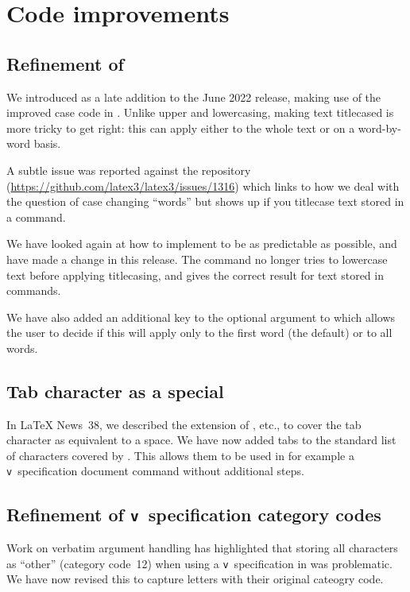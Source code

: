 \documentclass{ltnews}
\begin{document}
\section{Code improvements}

\subsection{Refinement of }

We introduced  as a late addition to the June
2022 release, making use of the improved case code in
. Unlike upper and lowercasing, making text
titlecased is more tricky to get right: this can apply either to
the whole text or on a word-by-word basis.

A subtle issue was reported against the  repository
(\url{https://github.com/latex3/latex3/issues/1316}) which links
to how we deal with the question of case changing
\enquote{words} but shows up if you titlecase text stored in a
command.

We have looked again at how to implement  to
be as predictable as possible, and have made a change in this
release. The command no longer tries to lowercase text before
applying titlecasing, and gives the correct result for text
stored in commands.

We have also added an additional key to the optional argument to
 which allows the user to decide if this will
apply only to the first word (the default) or to all words.

\subsection{Tab character as a special}

In \LaTeX{} News~38, we described the extension of , etc., to cover
the tab character as equivalent to a space. We have now added tabs to the
standard list of characters covered by . This allows them to
be used in for example a \texttt{v}~specification document command without
additional steps.

\subsection{Refinement of \texttt{v}~specification category codes}

Work on verbatim argument handling has highlighted that storing
all characters as \enquote{other} (category code~12) when using a
\texttt{v}~specification in  was problematic. We have now
revised this to capture letters with their original cateogry code.
\end{document}
